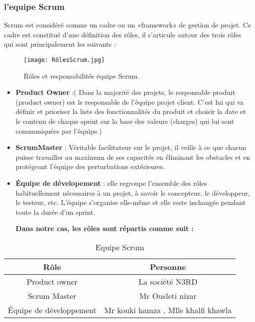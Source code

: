 \medskip
\subsubsection{l'equipe Scrum}
Scrum est considéré comme un cadre ou un «framework» de gestion de projet. Ce cadre est
constitué d’une définition des rôles, il s’articule autour des trois rôles qui sont principalement les suivants :
\begin{figure}[ht]
	\centering
	\texttt{[image: RôlesScrum.jpg]}
	\caption{Rôles et responsabilités équipe Scrum.}
	\label{fig:Rôles et responsabilités équipe Scrum}
\end{figure}
\medskip

\begin{itemize}
  \item \textbf{Product Owner} :\small ( Dans la majorité des projets, le responsable produit (product owner) est le responsable de l'équipe projet client. C'est lui qui va définir et prioriser la liste des fonctionnalités du produit et choisir la date et le contenu de chaque sprint sur la base des valeurs (charges) qui lui sont communiquées par l'équipe.)
  \smallskip
  \item \textbf{ScrumMaster} : Véritable facilitateur sur le projet, il veille à ce que chacun puisse travailler au maximum de ses capacités en éliminant les obstacles et en protégeant l'équipe des perturbations extérieures.
  \smallskip
  \item \textbf{Équipe de dévelopement} : elle regroupe l’ensemble des rôles habituellement nécessaires à un projet, à savoir le concepteur, le développeur, le testeur, etc. L'équipe s'organise elle-même et elle reste inchangée pendant toute la durée d'un sprint.

\textbf{Dans notre cas, les rôles sont répartis comme suit :}

\end{itemize}

\begin{table} [!ht]
	\centering
	\begin{tabular} {|c|c|}\hline
		Rôle & Personne \\  \hline
		Product owner     & La société N3RD      \\    \hline
		Scrum Master     & Mr Ousleti nizar    \\    \hline
		Équipe de développement    &  Mr kouki hamza ,
		Mlle khalfi khawla     \\    \hline	
		
	\end{tabular}
	\caption{Equipe Scrum}\label{tab: first-table}	
\end{table}

